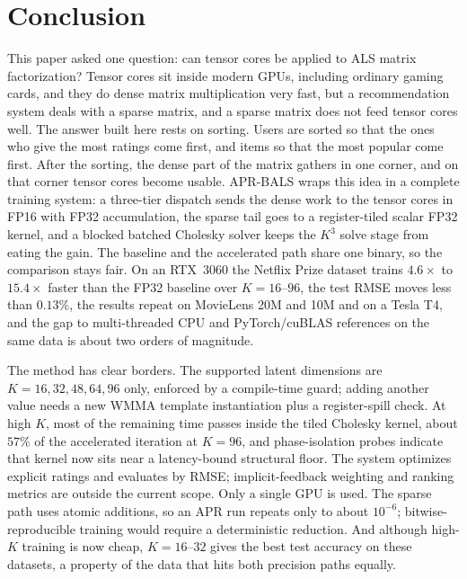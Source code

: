 \section{Conclusion}
\label{sec:conclusion}

This paper asked one question: can tensor cores be applied to ALS matrix factorization? Tensor cores sit inside modern GPUs, including ordinary gaming cards, and they do dense matrix multiplication very fast, but a recommendation system deals with a sparse matrix, and a sparse matrix does not feed tensor cores well. The answer built here rests on sorting. Users are sorted so that the ones who give the most ratings come first, and items so that the most popular come first. After the sorting, the dense part of the matrix gathers in one corner, and on that corner tensor cores become usable. APR-BALS wraps this idea in a complete training system: a three-tier dispatch sends the dense work to the tensor cores in FP16 with FP32 accumulation, the sparse tail goes to a register-tiled scalar FP32 kernel, and a blocked batched Cholesky solver keeps the $K^{3}$ solve stage from eating the gain. The baseline and the accelerated path share one binary, so the comparison stays fair. On an RTX~3060 the Netflix Prize dataset trains $4.6\times$ to $15.4\times$ faster than the FP32 baseline over $K = 16$--$96$, the test RMSE moves less than $0.13\%$, the results repeat on MovieLens 20M and 10M and on a Tesla T4, and the gap to multi-threaded CPU and PyTorch/cuBLAS references on the same data is about two orders of magnitude.

The method has clear borders. The supported latent dimensions are $K = 16, 32, 48, 64, 96$ only, enforced by a compile-time guard; adding another value needs a new WMMA template instantiation plus a register-spill check. At high $K$, most of the remaining time passes inside the tiled Cholesky kernel, about $57\%$ of the accelerated iteration at $K=96$, and phase-isolation probes indicate that kernel now sits near a latency-bound structural floor. The system optimizes explicit ratings and evaluates by RMSE; implicit-feedback weighting and ranking metrics are outside the current scope. Only a single GPU is used. The sparse path uses atomic additions, so an APR run repeats only to about $10^{-6}$; bitwise-reproducible training would require a deterministic reduction. And although high-$K$ training is now cheap, $K = 16$--$32$ gives the best test accuracy on these datasets, a property of the data that hits both precision paths equally.

